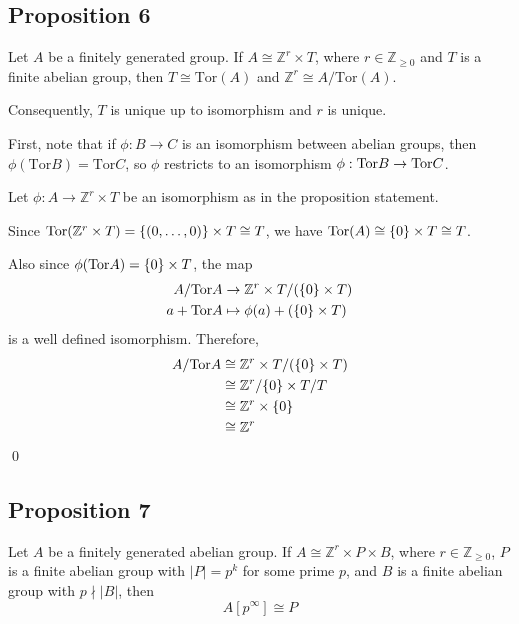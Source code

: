 \documentclass{article}
\renewenvironment{proof}{{\bfseries\color{blue1} Proof:}}{\qed}
\begin{document}
\subsection{Proposition 6}
\begin{idea}
    Let $A$ be a finitely generated group. If $A \cong \mathbb{Z}^r \times T$, where $r \in \mathbb{Z}_{\ge 0}$ and $T$ is a finite abelian group, then $T \cong \text{Tor}(A)$ and $\mathbb{Z}^r \cong A/\text{Tor}(A)$.
    \vspace{2mm}

    Consequently, $T$ is unique up to isomorphism and $r$ is unique.
\end{idea}
\begin{proof}
    First, note that if $\phi: B\rightarrow C$ is an isomorphism between abelian groups, then $\phi(\text{Tor}B)=\text{Tor}C$, so $\phi$ restricts to an isomorphism $\phi: \mathrm{Tor} B \rightarrow \mathrm{Tor} C$.

    Let $\phi: A\rightarrow \mathbb{Z}^r \times T$ be an isomorphism as in the proposition statement. 

    Since $\mathrm{Tor}(\mathbb{Z}^r \times T) = \{(0,\dots,0)\} \times T \cong T$, we have $\mathrm{Tor}(A) \cong \{0\} \times T \cong T$.

    Also since $\phi(\mathrm{Tor} A)= \{0\} \times T$, the map
    \begin{align*}
        A/\mathrm{Tor} A &\rightarrow \mathbb{Z}^r \times T/(\{0\} \times T) \\ 
        a + \mathrm{Tor} A &\mapsto \phi(a) + (\{0\} \times T)
    \end{align*}
    is a well defined isomorphism. Therefore,
    \begin{align*}
        A/\mathrm{Tor} A & \cong \mathbb{Z}^r \times T/(\{0\} \times T) \\ 
        &\cong \mathbb{Z}^r/\{0\} \times T/T \\ 
        &\cong \mathbb{Z}^r \times \{0\} \\ 
        &\cong \mathbb{Z}^r
    \end{align*}
\end{proof}
\subsection{Proposition 7}
\begin{idea}
    Let $A$ be a finitely generated abelian group. If $A \cong \mathbb{Z}^r \times P \times B$, where $r \in \mathbb{Z}_{\ge 0}$, $P$ is a finite abelian group with $|P|=p^k$ for some prime $p$, and $B$ is a finite abelian group with $p\nmid |B|$, then
    \begin{equation}
        A[p^\infty] \cong P
    \end{equation}
\end{idea}
\end{document}
